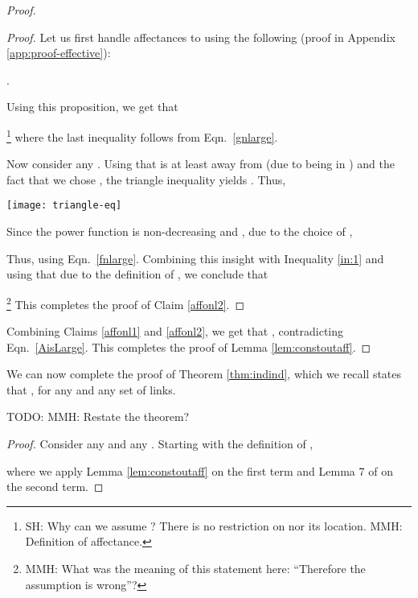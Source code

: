 \documentclass[11pt]{amsart}
\newcommand{\todo}[1]{{\begin{small}\sffamily \color{gray}TODO:  #1 \end{small}}}
\begin{document}
\begin{proof}
\begin{proof}
Let us first handle affectances to  using the following  (proof in Appendix \ref{app:proof-effective}):
\begin{proposition}
.
\label{prop:l3bound}
\end{proposition}


Using this proposition, we get that

\footnote{SH: Why can we assume ? There is no restriction on  nor its location. MMH: Definition of affectance.}
where the last inequality follows from Eqn.\ \ref{gnlarge}. 

Now consider any .
Using that  is at least  away from  (due to being in ) and the fact that we chose , the triangle inequality yields . Thus,
 

\iffalse
 
\fi  

\iffalse
 
\fi
\begin{figure*}[ht]
	\begin{center}
		\texttt{[image: triangle-eq]}
	\end{center}
	\caption{Nodes  and  play the role described in the proof. Here,  and . The red dotted lines indicate the relevant distances in the triangle inequality yielding .}\label{fig:triangle-eq}
\end{figure*}




Since the power function  is non-decreasing and , due to the choice of , 

Thus,  using Eqn.\ \ref{fnlarge}.
Combining this insight with Inequality \ref{in:1} and using that  due to the definition of , we conclude that

\footnote{MMH: What was the meaning of this statement here: ``Therefore the assumption  is wrong''?}
This completes the proof of Claim \ref{affonl2}.
\end{proof}

Combining Claims \ref{affonl1} and \ref{affonl2},
we get that , 
contradicting Eqn.\ \ref{AisLarge}. 
This completes the proof of Lemma \ref{lem:constoutaff}.
\end{proof}


\noindent We can now complete the proof of Theorem \ref{thm:indind},
which we recall states that , for any  and any set  of links.
\todo{MMH: Restate the theorem?}
\begin{proof}
Consider any  and any . 
Starting with the definition of ,

where we apply Lemma \ref{lem:constoutaff} on the first term and Lemma 7 of \cite{KV10} on the second term.
\end{proof}
\end{document}

